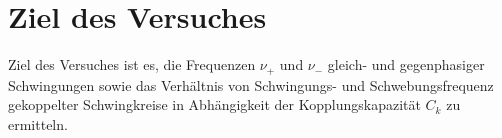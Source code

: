 \section{Ziel des Versuches}
\label{sec:ZieldesVersuches}
Ziel des Versuches ist es, die Frequenzen $ν_+$ und $ν_-$ gleich- und gegenphasiger Schwingungen sowie das Verhältnis von Schwingungs- und Schwebungsfrequenz
gekoppelter Schwingkreise in Abhängigkeit der Kopplungskapazität $C_k$ zu ermitteln. 